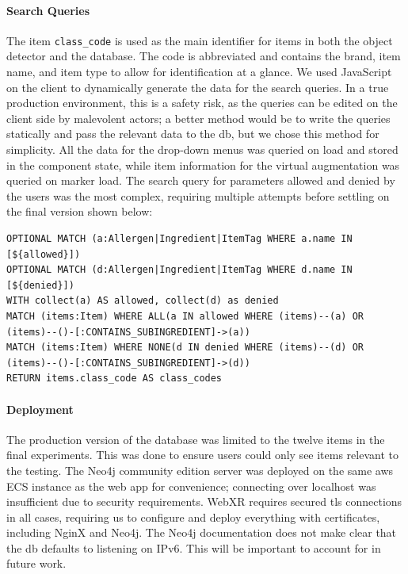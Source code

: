 \documentclass[thesis]{fputhesis}
\begin{document}
\begin{body}
\paragraph{Search Queries}
The item \verb|class_code| is used as the main identifier for items in both the object detector and the database. The code is abbreviated and contains the brand, item name, and item type to allow for identification at a glance. We used JavaScript on the client to dynamically generate the data for the search queries. In a true production environment, this is a safety risk, as the queries can be edited on the client side by malevolent actors; a better method would be to write the queries statically and pass the relevant data to the \acrshort{db}, but we chose this method for simplicity. All the data for the drop-down menus was queried on load and stored in the component state, while item information for the virtual augmentation was queried on marker load. 
The search query for parameters allowed and denied by the users was the most complex, requiring multiple attempts before settling on the final version shown below:
\begin{lstlisting}[language=Cypher]
OPTIONAL MATCH (a:Allergen|Ingredient|ItemTag WHERE a.name IN [${allowed}])
OPTIONAL MATCH (d:Allergen|Ingredient|ItemTag WHERE d.name IN [${denied}])
WITH collect(a) AS allowed, collect(d) as denied
MATCH (items:Item) WHERE ALL(a IN allowed WHERE (items)--(a) OR (items)--()-[:CONTAINS_SUBINGREDIENT]->(a)) 
MATCH (items:Item) WHERE NONE(d IN denied WHERE (items)--(d) OR (items)--()-[:CONTAINS_SUBINGREDIENT]->(d))
RETURN items.class_code AS class_codes
\end{lstlisting}

\paragraph{Deployment}
The production version of the database was limited to the twelve items in the final experiments. This was done to ensure users could only see items relevant to the testing. The Neo4j community edition server was deployed on the same \acrfull{aws} ECS instance as the web app for convenience; connecting over localhost was insufficient due to security requirements. WebXR requires secured \acrfull{tls} connections in all cases, requiring us to configure and deploy everything with certificates, including NginX and Neo4j. The Neo4j documentation does not make clear that the \acrshort{db} defaults to listening on IPv6. This will be important to account for in future work. 


\end{body}
\end{document}
